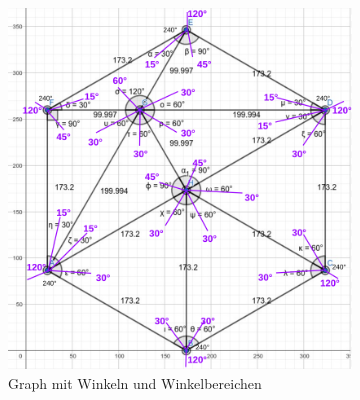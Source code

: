 \begin{figure}[H]
\centering
\begin{subfigure}{0.65\textwidth}
\centering
\includegraphics[width=0.95\linewidth]{assets/informatik-prototyp/graph-angles.png} 
\caption{Graph mit Winkeln und Winkelbereichen}
\label{fig:angled-graph}
\end{subfigure}
\begin{subfigure}{0.32\textwidth}
\centering

\end{subfigure}
\end{figure}
